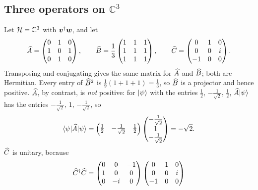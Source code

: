 \subsection{Three operators on \texorpdfstring{$\mathbb{C}^3$}{C3}}
\begin{example}
	Let $\mathcal{H} = \mathbb{C}^3$ with $\boldsymbol{v}^{\dagger}\boldsymbol{w}$, and let
	\begin{equation}
		\widehat{A} = \begin{pmatrix} 0 & 1 & 0 \\ 1 & 0 & 1 \\ 0 & 1 & 0 \end{pmatrix}, \qquad
		\widehat{B} = \frac13\begin{pmatrix} 1 & 1 & 1 \\ 1 & 1 & 1 \\ 1 & 1 & 1 \end{pmatrix}, \qquad
		\widehat{C} = \begin{pmatrix} 0 & 1 & 0 \\ 0 & 0 & i \\ -1 & 0 & 0 \end{pmatrix}.
	\end{equation}
	Transposing and conjugating gives the same matrix for $\widehat{A}$ and $\widehat{B}$; both are Hermitian. Every entry of $\widehat{B}^2$ is $\tfrac19(1 + 1 + 1) = \tfrac13$, so $\widehat{B}$ is a projector and hence positive. $\widehat{A}$, by contrast, is \emph{not} positive: for $\lvert \psi \rangle$ with the entries $\tfrac12$, $-\tfrac{1}{\sqrt{2}}$, $\tfrac12$, $\widehat{A}\lvert \psi \rangle$ has the entries $-\tfrac{1}{\sqrt{2}}$, $1$, $-\tfrac{1}{\sqrt{2}}$, so
	\begin{equation}
		\langle \psi \rvert \widehat{A} \lvert \psi \rangle
		= \begin{pmatrix} \frac12 & -\frac{1}{\sqrt{2}} & \frac12 \end{pmatrix}
		  \begin{pmatrix} - \frac{1}{\sqrt{2}} \\ 1 \\ -\frac{1}{\sqrt{2}} \end{pmatrix}
		= -\sqrt{2}.
	\end{equation}
	$\widehat{C}$ is unitary, because
	\begin{equation}
		\op{C}\adj\op{C}
		= \begin{pmatrix} 0 & 0 & -1 \\ 1 & 0 & 0 \\ 0 & -i & 0 \end{pmatrix}
		  \begin{pmatrix} 0 & 1 & 0 \\ 0 & 0 & i \\ -1 & 0 & 0 \end{pmatrix}

\end{equation}
\end{example}
